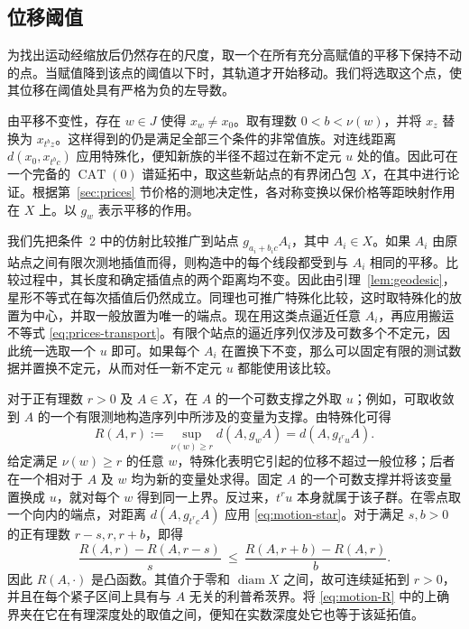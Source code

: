 \subsection{位移阈值}

为找出运动经缩放后仍然存在的尺度，取一个在所有充分高赋值的平移下保持不动的点。当赋值降到该点的阈值以下时，其轨道才开始移动。我们将选取这个点，使其位移在阈值处具有严格为负的左导数。

由平移不变性，存在 \(w\in J\) 使得 \(x_w\ne x_0\)。取有理数 \(0<b<\nu(w)\)，并将 \(x_z\) 替换为 \(x_{t^b z}\)。这样得到的仍是满足全部三个条件的非常值族。对连线距离 \(d(x_0,x_{t^bc})\) 应用特殊化，便知新族的半径不超过在新不定元 \(u\) 处的值。因此可在一个完备的 $\operatorname{CAT}(0)$ 谱延拓中，取这些新站点的有界闭凸包 \(X\)，在其中进行论证。根据第~\ref{sec:prices} 节价格的测地决定性，各对称变换以保价格等距映射作用在 \(X\) 上。以 \(g_w\) 表示平移的作用。

我们先把条件~2 中的仿射比较推广到站点 \(g_{a_i+b_i c}A_i\)，其中 \(A_i\in X\)。如果 \(A_i\) 由原站点之间有限次测地插值而得，则构造中的每个线段都受到与 \(A_i\) 相同的平移。比较过程中，其长度和确定插值点的两个距离均不变。因此由引理~\ref{lem:geodesic}，星形不等式在每次插值后仍然成立。同理也可推广特殊化比较，这时取特殊化的放置为中心，并取一般放置为唯一的端点。现在用这类点逼近任意 \(A_i\)，再应用搬运不等式 \eqref{eq:prices-transport}。有限个站点的逼近序列仅涉及可数多个不定元，因此统一选取一个 \(u\) 即可。如果每个 \(A_i\) 在置换下不变，那么可以固定有限的测试数据并置换不定元，从而对任一新不定元 \(u\) 都能使用该比较。

对于正有理数 \(r>0\) 及 \(A\in X\)，在 \(A\) 的一个可数支撑之外取 \(u\)；例如，可取收敛到 \(A\) 的一个有限测地构造序列中所涉及的变量为支撑。由特殊化可得
\begin{equation}\label{eq:motion-R}
 R(A,r):=\sup_{\nu(w)\ge r}d(A,g_w A)
          =d(A,g_{t^r u}A).
\end{equation}
给定满足 \(\nu(w)\ge r\) 的任意 \(w\)，特殊化表明它引起的位移不超过一般位移；后者在一个相对于 \(A\) 及 \(w\) 均为新的变量处求得。固定 \(A\) 的一个可数支撑并将该变量置换成 \(u\)，就对每个 \(w\) 得到同一上界。反过来，\(t^r u\) 本身就属于该子群。在零点取一个向内的端点，对距离 \(d(A,g_{t^rc}A)\) 应用 \eqref{eq:motion-star}。对于满足 \(s,b>0\) 的正有理数 \(r-s,r,r+b\)，即得
\[
 \frac{R(A,r)-R(A,r-s)}{s}
 \ \le\ \frac{R(A,r+b)-R(A,r)}{b}.
\]
因此 \(R(A,\cdot)\) 是凸函数。其值介于零和 \(\operatorname{diam}X\) 之间，故可连续延拓到 \(r>0\)，并且在每个紧子区间上具有与 \(A\) 无关的利普希茨界。将 \eqref{eq:motion-R} 中的上确界夹在它在有理深度处的取值之间，便知在实数深度处它也等于该延拓值。

